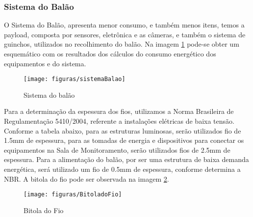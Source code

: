 \subsubsection{Sistema do Balão}

O Sistema do Balão, apresenta menor consumo, e também menos itens, temos a payload, composta por sensores, eletrônica e as câmeras, e também o sistema de guinchos, utilizados no recolhimento do balão.
Na imagem \ref{img:sistemaBalao} pode-se obter um esquemático com os resultados dos cálculos do consumo energético dos equipamentos e do sistema.

\begin{figure}[H]
	\centering
	\caption{Sistema do balão}
	\texttt{[image: figuras/sistemaBalao]}
	\label{img:sistemaBalao}
\end{figure}


Para a determinação da espessura dos fios, utilizamos a Norma Brasileira de Regulamentação 5410/2004, referente a instalações elétricas de baixa tensão. Conforme a tabela abaixo, para as estruturas luminosas, serão utilizados fio de 1.5mm de espessura, para as tomadas de energia e dispositivos para conectar os equipamentos na Sala de Monitoramento, serão utilizados fios de 2.5mm de espessura. Para a alimentação do balão, por ser uma estrutura de baixa demanda energética, será utilizado um fio de 0.5mm de espessura, conforme determina a NBR. A bitola do fio pode ser observada na imagem \ref{img:BitoladoFio}.

\begin{figure}[H]
	\centering
	\caption{Bitola do Fio}
	\texttt{[image: figuras/BitoladoFio]}
	\label{img:BitoladoFio}
\end{figure}
